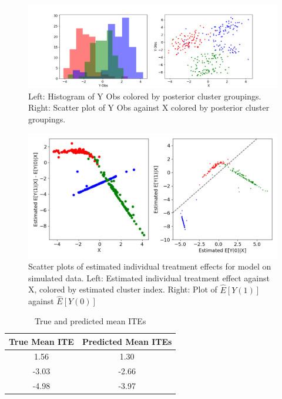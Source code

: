 \documentclass{article}
\begin{document}
\begin{figure}[h]
  \centering
  \includegraphics[width=1\textwidth]{Plots/simulated_cluster_scatter.png}
  \caption{Left: Histogram of Y Obs colored by posterior cluster groupings. Right: Scatter plot of Y Obs against X colored by posterior cluster groupings.}
  \label{fig:sim_scatter_plots}
\end{figure}

\begin{figure}[h]
  \centering
  \includegraphics[width=1\textwidth]{Plots/Simulated_output_scatted.png}
  \caption{Scatter plots of estimated individual treatment effects for model on simulated data. Left: Estimated individual treatment effect against X, colored by estimated cluster index. Right: Plot of $\hat{E}[Y(1)]$ against $\hat{E}[Y(0)]$}
  \label{fig:sim_scatter_plots}
\end{figure}

\begin{table}[h]
\centering
\begin{tabular}{cc}
\hline
True Mean ITE & Predicted Mean ITEs \\
\hline
1.56 & 1.30 \\
-3.03 & -2.66 \\
-4.98 & -3.97 \\
\hline
\end{tabular}
\caption{True and predicted mean ITEs}
\label{tab:simulated_ITEs}
\end{table}
\end{document}
